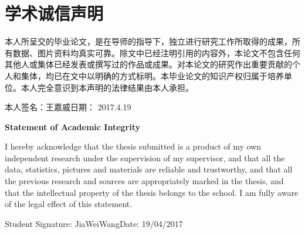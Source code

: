 \chapter*{学术诚信声明}
\fontsize{15}{20}\selectfont
	本人所呈交的毕业论文，是在导师的指导下，独立进行研究工作所取得的成果，所有数据、图片资料均真实可靠。除文中已经注明引用的内容外，本论文不包含任何其他人或集体已经发表或撰写过的作品或成果。对本论文的研究作出重要贡献的个人和集体，均已在文中以明确的方式标明。本毕业论文的知识产权归属于培养单位。本人完全意识到本声明的法律结果由本人承担。
\vspace{2\baselineskip}

本人签名：王嘉威\hfill 日期： 2017.4.19\hspace{4cm}

\vspace{2\baselineskip}

\begin{center}
	{\bfseries Statement of Academic Integrity}
\end{center}

I hereby acknowledge that the thesis submitted is a product of my own independent research under the supervision of my supervisor, and that all the data, statistics, pictures and materials are reliable and trustworthy, and that all the previous research and sources are appropriately marked in the thesis, and that the intellectual property of the thesis belongs to the school. I am fully aware of the legal effect of this statement.

\vspace{2\baselineskip}

Student Signature: JiaWeiWang\hfill Date: 19/04/2017\hspace{4cm}
\endinput
